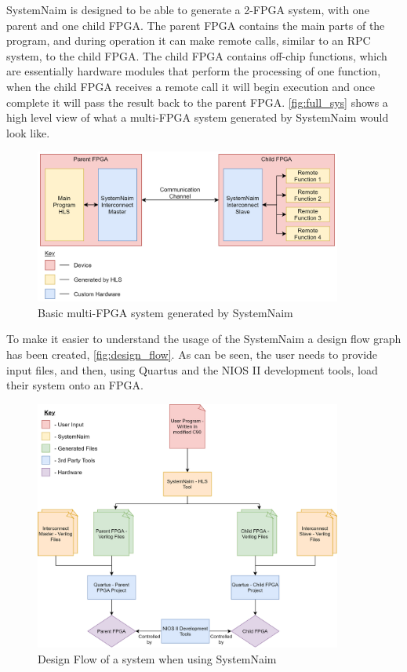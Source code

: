 SystemNaim is designed to be able to generate a 2-FPGA system, with one parent and one child FPGA. The parent FPGA contains the main parts of the program, and during operation it can make remote calls, similar to an RPC system, to the child FPGA. The child FPGA contains off-chip functions, which are essentially hardware modules that perform the processing of one function, when the child FPGA receives a remote call it will begin execution and once complete it will pass the result back to the parent FPGA. \autoref{fig:full_sys} shows a high level view of what a multi-FPGA system generated by SystemNaim would look like.

\begin{figure}[!htb]
    \centering
    \includegraphics[width=0.9\textwidth]{03_design/images/full_system.png}
    \caption{Basic multi-FPGA system generated by SystemNaim}
    \label{fig:full_sys}
\end{figure}

To make it easier to understand the usage of the SystemNaim a design flow graph has been created, \autoref{fig:design_flow}. As can be seen, the user needs to provide input files, and then, using Quartus and the NIOS II development tools, load their system onto an FPGA.

\begin{figure}
    \centering
    \includegraphics[width=0.9\textwidth]{03_design/images/design_flow.png}
    \caption{Design Flow of a system when using SystemNaim}
    \label{fig:design_flow}
\end{figure}